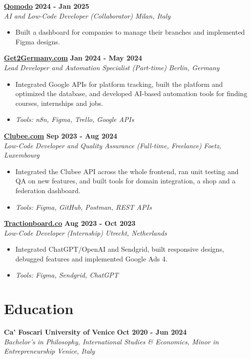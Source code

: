\documentclass[a4paper,11pt]{article}
\newcommand{\role}[4]{%
 \textbf{#1} \hfill \textbf{#2}\\[1pt]%
 \textit{#3} \hfill \textit{#4}\\[2pt]%
}
\begin{document}
\role{\href{https://www.qomodo.me/}{Qomodo}}{2024 - Jan 2025}{AI and Low-Code Developer (Collaborator)}{Milan, Italy}
\begin{itemize}
 \item Built a dashboard for companies to manage their branches and implemented Figma designs.
\end{itemize}

\role{\href{https://get2germany.com}{Get2Germany.com}}{Jan 2024 - May 2024}{Lead Developer and Automation Specialist (Part-time)}{Berlin, Germany}
\begin{itemize}
 \item Integrated Google APIs for platform tracking, built the platform and optimized the database, and developed AI-based automation tools for finding courses, internships and jobs.
 \item \textit{Tools: n8n, Figma, Trello, Google APIs}
\end{itemize}

\role{\href{https://clubee.com}{Clubee.com}}{Sep 2023 - Aug 2024}{Low-Code Developer and Quality Assurance (Full-time, Freelance)}{Foetz, Luxembourg}
\begin{itemize}
 \item Integrated the Clubee API across the whole frontend, ran unit testing and QA on new features, and built tools for domain integration, a shop and a federation dashboard.
 \item \textit{Tools: Figma, GitHub, Postman, REST APIs}
\end{itemize}

\role{\href{https://tractionboard.co}{Tractionboard.co}}{Aug 2023 - Oct 2023}{Low-Code Developer (Internship)}{Utrecht, Netherlands}
\begin{itemize}
 \item Integrated ChatGPT/OpenAI and Sendgrid, built responsive designs, debugged features and implemented Google Ads 4.
 \item \textit{Tools: Figma, Sendgrid, ChatGPT}
\end{itemize}

\section{Education}
\role{Ca' Foscari University of Venice}{Oct 2020 - Jun 2024}{Bachelor's in Philosophy, International Studies \& Economics, Minor in Entrepreneurship}{Venice, Italy}
\end{document}
